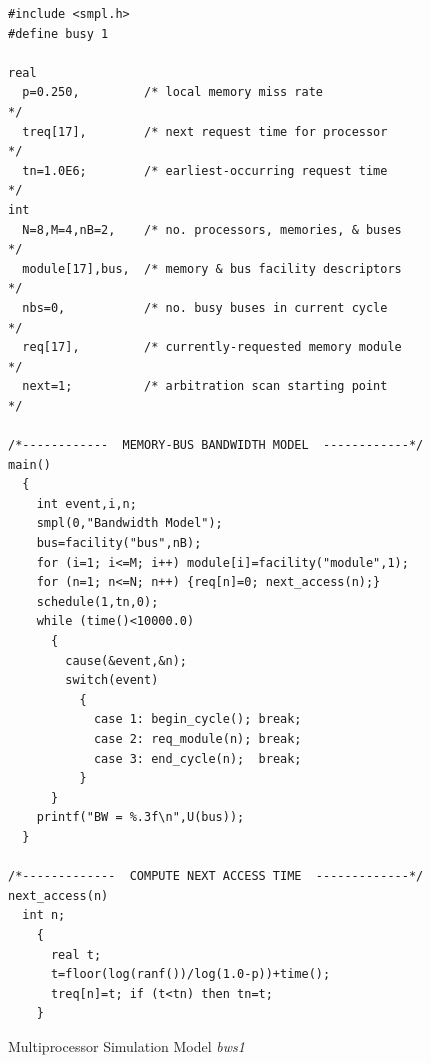 \begin{figure}[p]
\centering
\begin{minipage}{.98\textwidth}
\begin{lstlisting}[basicstyle=\ttfamily\scriptsize]
#include <smpl.h>
#define busy 1

real
  p=0.250,         /* local memory miss rate                */
  treq[17],        /* next request time for processor       */
  tn=1.0E6;        /* earliest-occurring request time       */
int
  N=8,M=4,nB=2,    /* no. processors, memories, & buses     */
  module[17],bus,  /* memory & bus facility descriptors     */
  nbs=0,           /* no. busy buses in current cycle       */
  req[17],         /* currently-requested memory module     */
  next=1;          /* arbitration scan starting point       */

/*------------  MEMORY-BUS BANDWIDTH MODEL  ------------*/
main()
  {
    int event,i,n;
    smpl(0,"Bandwidth Model");
    bus=facility("bus",nB);
    for (i=1; i<=M; i++) module[i]=facility("module",1);
    for (n=1; n<=N; n++) {req[n]=0; next_access(n);}
    schedule(1,tn,0);
    while (time()<10000.0)
      {
        cause(&event,&n);
        switch(event)
          {
            case 1: begin_cycle(); break;
            case 2: req_module(n); break;
            case 3: end_cycle(n);  break;
          }
      }
    printf("BW = %.3f\n",U(bus));
  }

/*-------------  COMPUTE NEXT ACCESS TIME  -------------*/
next_access(n)
  int n;
    {
      real t;
      t=floor(log(ranf())/log(1.0-p))+time();
      treq[n]=t; if (t<tn) then tn=t;
    }
\end{lstlisting}
\end{minipage}
\caption{Multiprocessor Simulation Model \emph{bws1}}
\end{figure}


